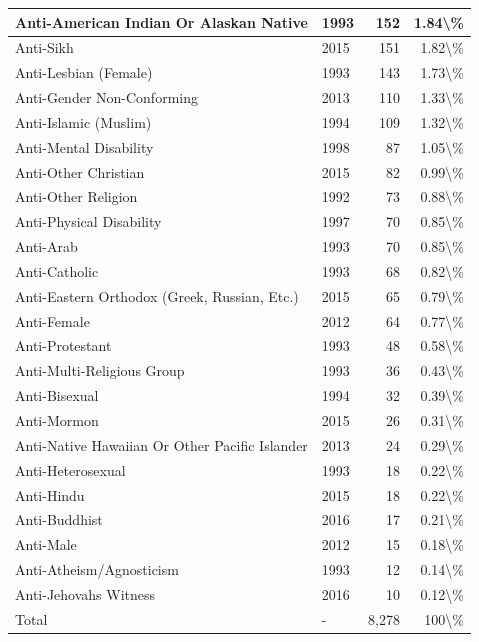 \documentclass[
]{krantz}
\begin{document}
\begin{longtable}[t]{l|l|r|r}
\hline
Anti-American Indian Or Alaskan Native & 1993 & 152 & 1.84\textbackslash{}\%\\
\hline
Anti-Sikh & 2015 & 151 & 1.82\textbackslash{}\%\\
\hline
Anti-Lesbian (Female) & 1993 & 143 & 1.73\textbackslash{}\%\\
\hline
Anti-Gender Non-Conforming & 2013 & 110 & 1.33\textbackslash{}\%\\
\hline
Anti-Islamic (Muslim) & 1994 & 109 & 1.32\textbackslash{}\%\\
\hline
Anti-Mental Disability & 1998 & 87 & 1.05\textbackslash{}\%\\
\hline
Anti-Other Christian & 2015 & 82 & 0.99\textbackslash{}\%\\
\hline
Anti-Other Religion & 1992 & 73 & 0.88\textbackslash{}\%\\
\hline
Anti-Physical Disability & 1997 & 70 & 0.85\textbackslash{}\%\\
\hline
Anti-Arab & 1993 & 70 & 0.85\textbackslash{}\%\\
\hline
Anti-Catholic & 1993 & 68 & 0.82\textbackslash{}\%\\
\hline
Anti-Eastern Orthodox (Greek, Russian, Etc.) & 2015 & 65 & 0.79\textbackslash{}\%\\
\hline
Anti-Female & 2012 & 64 & 0.77\textbackslash{}\%\\
\hline
Anti-Protestant & 1993 & 48 & 0.58\textbackslash{}\%\\
\hline
Anti-Multi-Religious Group & 1993 & 36 & 0.43\textbackslash{}\%\\
\hline
Anti-Bisexual & 1994 & 32 & 0.39\textbackslash{}\%\\
\hline
Anti-Mormon & 2015 & 26 & 0.31\textbackslash{}\%\\
\hline
Anti-Native Hawaiian Or Other Pacific Islander & 2013 & 24 & 0.29\textbackslash{}\%\\
\hline
Anti-Heterosexual & 1993 & 18 & 0.22\textbackslash{}\%\\
\hline
Anti-Hindu & 2015 & 18 & 0.22\textbackslash{}\%\\
\hline
Anti-Buddhist & 2016 & 17 & 0.21\textbackslash{}\%\\
\hline
Anti-Male & 2012 & 15 & 0.18\textbackslash{}\%\\
\hline
Anti-Atheism/Agnosticism & 1993 & 12 & 0.14\textbackslash{}\%\\
\hline
Anti-Jehovahs Witness & 2016 & 10 & 0.12\textbackslash{}\%\\
\hline
Total & - & 8,278 & 100\textbackslash{}\%\\
\hline
\end{longtable}
\end{document}
